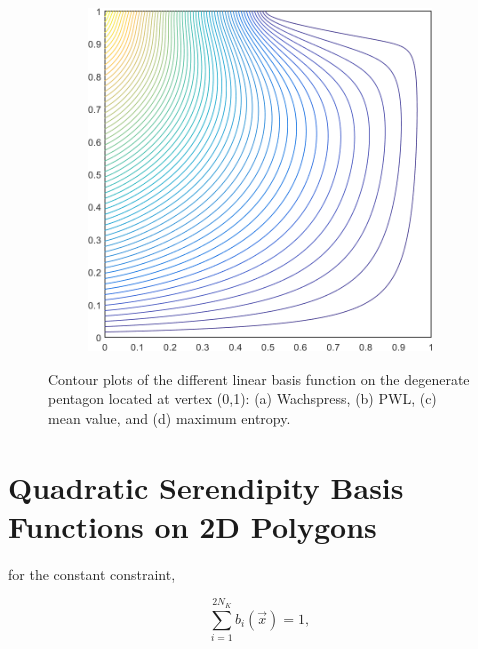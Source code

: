 \begin{figure}
\begin{subfigure}[b]{0.39\textwidth}
		\caption{}
	\end{subfigure}
	\hspace{1.5cm}
	\begin{subfigure}[b]{0.39\textwidth}
		\centering
		\includegraphics[width=\textwidth]{figures/sec_BF/deg_square_MAXENT1_contour_b5.png}
		\caption{}
	\end{subfigure}
\caption[Contour plots of the linear basis functions on the degenerate pentagon.]{Contour plots of the different linear basis function on the degenerate pentagon located at vertex (0,1): (a) Wachspress, (b) PWL, (c) mean value, and (d) maximum entropy.}
\end{figure}

\section{Quadratic Serendipity Basis Functions on 2D Polygons}
\label{sec::BF_2DQuadratic}

for the constant constraint,

\begin{equation}
\sum_{i=1}^{2 N_K}  b_i (\vec{x})  = 1 ,
\label{eq::BF_quad_interp_req_constant}
\end{equation}


